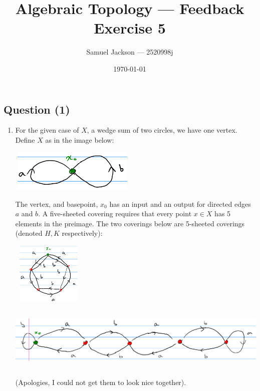 \documentclass{article}
\title{Algebraic Topology  --- Feedback Exercise 5}
\author{Samuel Jackson --- 2520998j}
\date{\today}
\begin{document}
\maketitle

\newcommand{\R}{\mathbb{R}}
\newcommand{\Z}{\mathbb{Z}}
\newcommand{\N}{\mathbb{N}}
\newcommand{\fund}{\pi_1}
\newcommand{\pind}{p_{\ast}}


\begin{center}
    \section*{Question (1)}
\end{center}

\begin{flushleft}
	\begin{enumerate}[label=\alph*)]
		\item For the given case of $X$, a wedge sum of two circles, we have one vertex. Define $X$ as in the image below:  
		\begin{center}
			\includegraphics[height=2cm, width=6cm]{images/original-X.png}
		\end{center}
		The vertex, and basepoint, $x_0$ has an input and an output for directed edges $a$ and $b$. A five-sheeted covering requires that every point $x \in X$ has 5 elements in the preimage. The two coverings below are 5-sheeted coverings (denoted $H, K$ respectively):
		
		\begin{center}
			\includegraphics[height=3cm, width=3.5cm]{images/circular-sheet-covering.png}
		\end{center}
		\begin{center}
			\includegraphics[height=3cm, width=13cm]{images/chain-sheet-covering.png}
		\end{center}
		(Apologies, I could not get them to look nice together).
		

\end{enumerate}
\end{flushleft}
\end{document}
